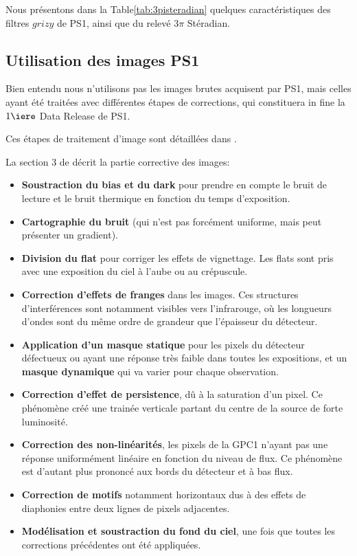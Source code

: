 \documentclass[../main/main.tex]{subfiles}
\begin{document}
Nous présentons dans la Table\ref{tab:3pisteradian} quelques
caractéristiques des filtres $grizy$ de PS1, ainsi que du relevé $3\pi$
Stéradian.

\subsection{Utilisation des images PS1}
\label{ssec:preprocessps1}

Bien entendu nous n'utilisons pas les images brutes acquisent par PS1,
mais celles ayant été traitées avec différentes étapes de corrections,
qui constituera in fine la $1\iere$ Data Release de PS1.

Ces étapes de traitement d'image sont détaillées dans
\citet{Waters2020}.

La section 3 de \citet{Waters2020} décrit la partie corrective des
images:

\begin{itemize}[label=$\diamondsuit$]
  \itemsep0em 
   \item \textbf{Soustraction du bias et du dark} pour prendre en compte le bruit
     de lecture et le bruit thermique en fonction du temps d'exposition.
   \item \textbf{Cartographie du bruit} (qui n'est pas forcément uniforme, mais peut
     présenter un gradient).
   \item \textbf{Division du flat} pour corriger les effets de vignettage. Les
     flats sont pris avec une exposition du ciel à l'aube ou au
     crépuscule.
   \item  \textbf{Correction d'effets de franges} dans les images. Ces structures
     d'interférences sont notamment visibles vers l'infrarouge, où les
     longueurs d'ondes sont du même ordre de grandeur que l'épaisseur du
     détecteur.
   \item \textbf{Application d'un masque statique} pour les pixels du détecteur
     défectueux ou ayant une réponse très faible dans toutes les expositions, et un \textbf{masque dynamique}
     qui va varier pour chaque observation.
   \item \textbf{Correction d'effet de persistence}, dû à la saturation d'un
     pixel. Ce phénomène créé une trainée verticale partant du centre de
     la source de forte luminosité.
   \item \textbf{Correction des non-linéarités}, les pixels de la GPC1
     n'ayant pas une réponse uniformément linéaire en fonction du niveau
     de flux. Ce phénomène est d'autant plus prononcé aux bords du
     détecteur et à bas flux.
   \item \textbf{Correction de motifs} notamment horizontaux dus à des
     effets de 
     diaphonies entre deux lignes de pixels adjacentes.
   \item \textbf{Modélisation et soustraction du fond du ciel}, une fois
     que toutes les corrections précédentes ont été appliquées.
\end{itemize}
\end{document}

